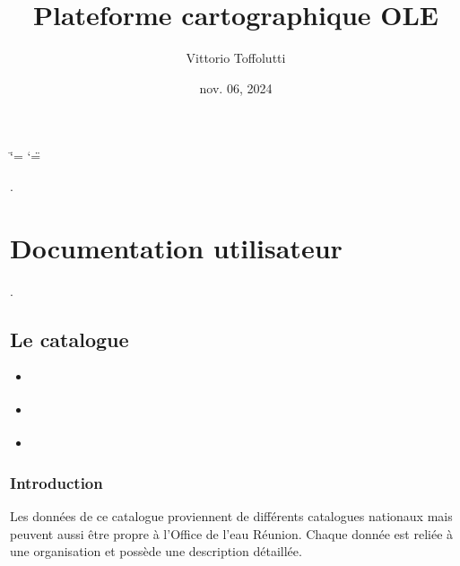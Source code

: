 \documentclass[letterpaper,10pt,french]{sphinxmanual}
\title{Plateforme cartographique OLE}
\date{nov. 06, 2024}
\author{Vittorio Toffolutti}
\begin{document}
\ifdefined\shorthandoff
  \ifnum\catcode`\=\string=\active\shorthandoff{=}\fi
  \ifnum\catcode`\"=\active{}\fi
\fi

\pagestyle{empty}
\sphinxmaketitle
\pagestyle{plain}
\sphinxtableofcontents
\pagestyle{normal}
\label{\detokenize{index::doc}}


\sphinxAtStartPar
{}.

\sphinxstepscope


\chapter{Documentation utilisateur}
\label{\detokenize{doc_user:documentation-utilisateur}}\label{\detokenize{doc_user::doc}}
\sphinxAtStartPar
{}.

\sphinxstepscope


\section{Le catalogue}
\label{\detokenize{doc_user/catalogue:le-catalogue}}\label{\detokenize{doc_user/catalogue::doc}}
\begin{sphinxShadowBox}
\begin{itemize}
\item {} 
\sphinxAtStartPar
{}\label{\detokenize{doc_user/catalogue:id2}}{\hyperref[\detokenize{doc_user/catalogue:introduction}]{}}

\item {} 
\sphinxAtStartPar
{}\label{\detokenize{doc_user/catalogue:id3}}{\hyperref[\detokenize{doc_user/catalogue:la-recherche-de-donnee-dans-le-catalogue}]{}}

\item {} 
\sphinxAtStartPar
{}\label{\detokenize{doc_user/catalogue:id4}}{\hyperref[\detokenize{doc_user/catalogue:les-fonctionnalites-des-fiches-de-donnees}]{}}

\end{itemize}
\end{sphinxShadowBox}


\subsection{Introduction}
\label{\detokenize{doc_user/catalogue:introduction}}
\sphinxAtStartPar
Les données de ce catalogue proviennent de différents catalogues nationaux mais peuvent aussi être propre à l’Office de l’eau Réunion.
Chaque donnée est reliée à une organisation et possède une description détaillée.
\end{document}
